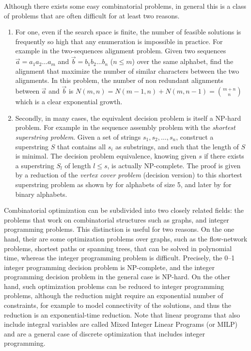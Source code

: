 	Although there exists some easy combinatorial problems, in general this is a class of problems that are often difficult for at least two reasons.
	\begin{enumerate}
		\item For one, even if the search space is finite, the number of feasible solutions is frequently so high that any enumeration is impossible in practice.
			For example in the two-sequences alignment problem.
			Given two sequences $\vec{a}=a_1a_2\ldots{}a_m$ and $\vec{b}=b_1b_2\ldots{}b_n$ ($n \leq m$) over the same alphabet, find the alignment that maximize the number of similar characters between the two alignments.
			In this problem, the number of non redundant alignments between $\vec{a}$ and $\vec{b}$ is $N(m,n)=N(m-1,n)+N(m,n-1)=\binom{m+n}{n}$ which is a clear exponential growth.

		\item Secondly, in many cases, the equivalent decision problem is itself a NP-hard problem.
			For example in the sequence assembly problem with the \emph{shortest superstring problem}.
			Given a set of strings $s_1, s_2, \ldots, s_n$, construct a superstring $S$ that contains all $s_i$ as substrings, and such that the length of $S$ is minimal.
			The decision problem equivalence, knowing given $s$ if there exists a superstring $S_l$ of length $l \leq s$, is actually NP-complete.
			The proof is given by a reduction of the \emph{vertex cover problem} (decision version) to this shortest superstring problem as shown by \textcite{maier1978complexity} for alphabets of size 5, and later by \textcite{raiha1981shortest} for binary alphabets.
	\end{enumerate}

	Combinatorial optimization can be subdivided into two closely related fields: the problems that work on combinatorial structures such as graphs, and integer programming problems.
	This distinction is useful for two reasons.
	On the one hand, their are some optimization problems over graphs, such as the flow-network problems, shortest paths or spanning trees, that can be solved in polynomial time, whereas the integer programming problem is difficult.
	Precisely, the 0--1 integer programming decision problem is NP-complete, and the integer programming decision problem in the general case is NP-hard.
	On the other hand, such optimization problems can be reduced to integer programming problems, although the reduction might require an exponential number of constraints, for example to model connectivity of the solutions, and thus the reduction is an exponential-time reduction.
	Note that linear programs that also include integral variables are called Mixed Integer Linear Programs (or MILP) and are a general case of discrete optimization that includes integer programming.

